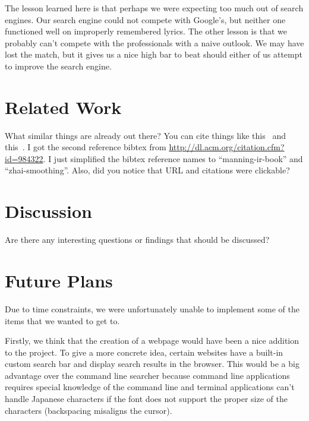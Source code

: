 \documentclass{acm} %
\begin{document}
\begin{CJK}{UTF8}{zhsong}

The lesson learned here is that perhaps we were expecting too much out of search engines. Our search engine could not compete with Google's, but neither one functioned well on improperly remembered lyrics. The other lesson is that we probably can't compete with the professionals with a naive outlook. We may have lost the match, but it gives us a nice high bar to beat should either of us attempt to improve the search engine.



\section{Related Work}

What similar things are already out there? You can cite things like
this~\cite{manning-ir-book} and this~\cite{zhai-smoothing}. I got the second
reference bibtex from \url{http://dl.acm.org/citation.cfm?id=984322}. I just
simplified the bibtex reference names to ``manning-ir-book'' and
``zhai-smoothing''. Also, did you notice that URL and citations were clickable?

\section{Discussion}

Are there any interesting questions or findings that should be discussed?

\section{Future Plans}

Due to time constraints, we were unfortunately unable to implement some of the items that we wanted to get to.

Firstly, we think that the creation of a webpage would have been a nice addition to the project. To give a more concrete idea, certain websites have a built-in custom search bar and display search results in the browser. This would be a big advantage over the command line searcher because command line applications requires special knowledge of the command line and terminal applications can't handle Japanese characters if the font does not support the proper size of the characters (backspacing misaligns the cursor).


\end{CJK}
\end{document}
